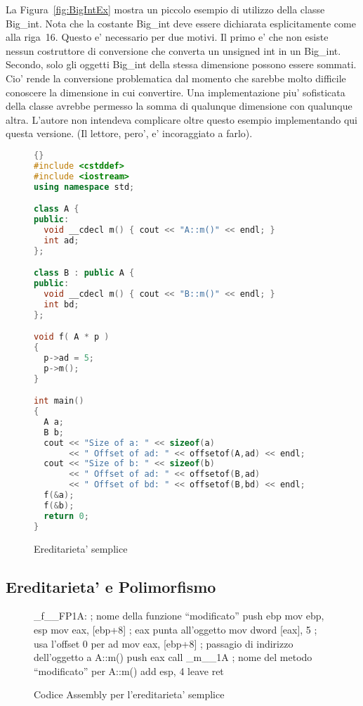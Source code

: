 La Figura~\ref{fig:BigIntEx} mostra un piccolo esempio di utilizzo della
classe {\code Big\_int}. Nota che la costante {\code Big\_int} deve essere
dichiarata esplicitamente come alla riga~16. Questo e' necessario per due 
motivi. Il primo e' che non esiste nessun costruttore di conversione che
converta un unsigned int in un {\code Big\_int}. Secondo, solo gli oggetti
{\code Big\_int} della stessa dimensione possono essere sommati. Cio'
rende la conversione problematica dal momento che sarebbe molto difficile
conoscere la dimensione in cui convertire. Una implementazione piu'
sofisticata della classe avrebbe permesso la somma di qualunque dimensione
con qualunque altra. L'autore non intendeva complicare oltre questo esempio
implementando qui questa versione. (Il lettore, pero', e' incoraggiato a
farlo).

\begin{figure}[tp]
\begin{lstlisting}[language=C++, frame=tlrb]{}
#include <cstddef>
#include <iostream>
using namespace std;

class A {
public:
  void __cdecl m() { cout << "A::m()" << endl; }
  int ad;
};

class B : public A {
public:
  void __cdecl m() { cout << "B::m()" << endl; }
  int bd;
};

void f( A * p )
{
  p->ad = 5;
  p->m();
}

int main()
{
  A a;
  B b;
  cout << "Size of a: " << sizeof(a)
       << " Offset of ad: " << offsetof(A,ad) << endl;
  cout << "Size of b: " << sizeof(b)
       << " Offset of ad: " << offsetof(B,ad)
       << " Offset of bd: " << offsetof(B,bd) << endl;
  f(&a);
  f(&b);
  return 0;
}
\end{lstlisting}
\caption{ Ereditarieta' semplice \label{fig:SimpInh}}
\end{figure}


\subsection{Ereditarieta' e Polimorfismo}


\begin{figure}[tp]
\begin{AsmCodeListing}
_f__FP1A:                       ; nome della funzione ``modificato''
      push   ebp
      mov    ebp, esp
      mov    eax, [ebp+8]       ; eax punta all'oggetto
      mov    dword [eax], 5     ; usa l'offset 0 per ad
      mov    eax, [ebp+8]       ; passagio di indirizzo dell'oggetto a A::m()
      push   eax
      call   _m__1A             ; nome del metodo ``modificato'' per A::m()
      add    esp, 4
      leave
      ret
\end{AsmCodeListing}
\caption{Codice Assembly per l'ereditarieta' semplice \label{fig:FAsm1}}
\end{figure}

